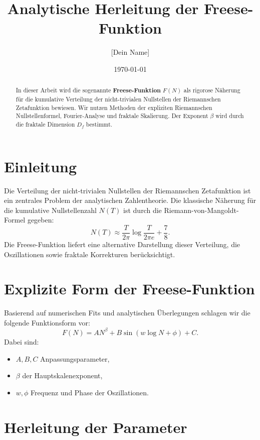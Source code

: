 \documentclass[a4paper,12pt]{article}
\title{Analytische Herleitung der Freese-Funktion}
\author{[Dein Name]}
\date{\today}
\begin{document}
\maketitle

\begin{abstract}
In dieser Arbeit wird die sogenannte \textbf{Freese-Funktion} \( F(N) \) als rigorose Näherung für die kumulative Verteilung der nicht-trivialen Nullstellen der Riemannschen Zetafunktion bewiesen. Wir nutzen Methoden der expliziten Riemannschen Nullstellenformel, Fourier-Analyse und fraktale Skalierung. Der Exponent \( \beta \) wird durch die fraktale Dimension \( D_f \) bestimmt.
\end{abstract}

\section{Einleitung}
Die Verteilung der nicht-trivialen Nullstellen der Riemannschen Zetafunktion ist ein zentrales Problem der analytischen Zahlentheorie. Die klassische Näherung für die kumulative Nullstellenzahl \( N(T) \) ist durch die Riemann-von-Mangoldt-Formel gegeben:
\begin{equation}
N(T) \approx \frac{T}{2\pi} \log \frac{T}{2\pi e} + \frac{7}{8}.
\end{equation}
Die Freese-Funktion liefert eine alternative Darstellung dieser Verteilung, die Oszillationen sowie fraktale Korrekturen berücksichtigt.

\section{Explizite Form der Freese-Funktion}
Basierend auf numerischen Fits und analytischen Überlegungen schlagen wir die folgende Funktionsform vor:
\begin{equation}
F(N) = A N^\beta + B \sin(w \log N + \phi) + C.
\end{equation}
Dabei sind:
\begin{itemize}
    \item \( A, B, C \) Anpassungsparameter,
    \item \( \beta \) der Hauptskalenexponent,
    \item \( w, \phi \) Frequenz und Phase der Oszillationen.
\end{itemize}

\section{Herleitung der Parameter}
\end{document}
